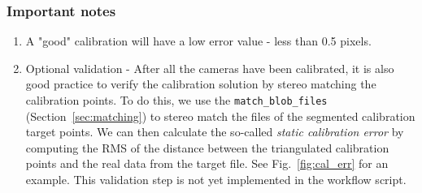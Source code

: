 \documentclass[10pt,a4paper]{article}
\begin{document}
%	
%	
%	
%	
%	


\subsubsection{Important notes}

\begin{enumerate}
	\item A "good" calibration will have a low error value - less than 0.5 pixels.  
	
	\item Optional validation - After all the cameras have been calibrated, it is also good practice to verify the calibration solution by stereo matching the calibration points. To do this, we use the \texttt{match\_blob\_files} (Section~\ref{sec:matching}) to stereo match the files of the segmented calibration target points. We can then calculate the so-called \textit{static calibration error} by computing the RMS of the distance between the triangulated calibration points and the real data from the target file. See Fig.~\ref{fig:cal_err} for an example. This validation step is not yet implemented in the workflow script. 
\end{enumerate}
\end{document}
